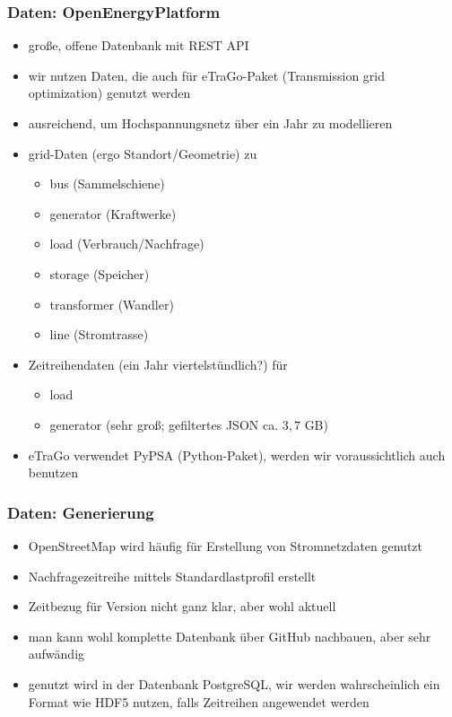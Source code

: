 \documentclass[aspectratio=169,t]{beamer}
\begin{document}
	\begin{frame}
		\frametitle{Daten: Open­Energy­Platform}
		\begin{itemize}
			\item große, offene Datenbank mit REST API
			\item wir nutzen Daten, die auch für eTraGo-Paket (Transmission grid optimization) genutzt werden
			\item ausreichend, um Hochspannungsnetz über ein Jahr zu modellieren
			\item grid-Daten (ergo Standort/Geometrie) zu
			\begin{itemize}
				\item bus (Sammelschiene)
				\item generator (Kraftwerke)
				\item load (Verbrauch/Nachfrage)
				\item storage (Speicher)
				\item transformer (Wandler)
				\item line (Stromtrasse)
			\end{itemize}
			\item Zeitreihendaten (ein Jahr viertelstündlich?) für
			\begin{itemize}
				\item load 
				\item generator (sehr groß; gefiltertes JSON ca. $3{,}7$ GB)
			\end{itemize}
			\item eTraGo verwendet PyPSA (Python-Paket), werden wir voraussichtlich auch benutzen
		\end{itemize}
	\end{frame}
	
	\begin{frame}
		\frametitle{Daten: Generierung}
		\begin{itemize}
			\item OpenStreetMap wird häufig für Erstellung von Stromnetzdaten genutzt
			\item Nachfragezeitreihe mittels Standardlastprofil erstellt
			\item Zeitbezug für Version nicht ganz klar, aber wohl aktuell
			\item man kann wohl komplette Datenbank über GitHub nachbauen, aber sehr aufwändig
			\item genutzt wird in der Datenbank PostgreSQL, wir werden wahrscheinlich ein Format wie HDF5 nutzen, falls Zeitreihen angewendet werden
		\end{itemize}
	\end{frame}
\end{document}
